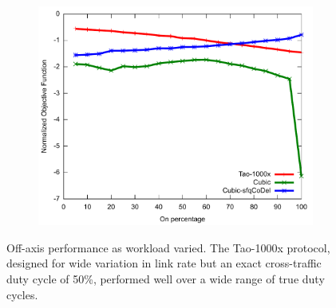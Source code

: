 \begin{figure}
\begin{subfigure}[b]{0.33\textwidth}
\includegraphics[width=\textwidth]{figures/workload-agility-util.pdf}
\end{subfigure}
\caption{Off-axis performance as workload varied. The Tao-1000x protocol,
  designed for wide variation in link rate but an exact cross-traffic
duty cycle of 50\%, performed well over a wide range of true duty cycles.}
\label{fig:workload-agility}
\end{figure}


